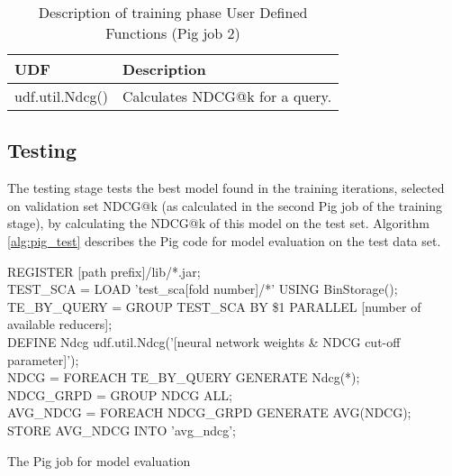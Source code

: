 \begin{table}
\centering
\begin{tabular}{p{6cm}p{7cm}}\toprule
UDF & Description \\
\midrule
udf.util.Ndcg() & Calculates \ac{NDCG}@k for a query.\\
\bottomrule
\end{tabular}
\caption{Description of training phase User Defined Functions (Pig job 2)}
\label{tbl:training_udfs_2}
\end{table}

\subsection{Testing}
The testing stage tests the best model found in the training iterations, selected on validation set \ac{NDCG}@k (as calculated in the second Pig job of the training stage), by calculating the \ac{NDCG}@k of this model on the test set. Algorithm \ref{alg:pig_test} describes the Pig code for model evaluation on the test data set.\\

\begin{algorithm}
REGISTER [path prefix]/lib/*.jar;\\
TEST\_SCA = LOAD 'test\_sca[fold number]/*' USING BinStorage();\\
TE\_BY\_QUERY = GROUP TEST\_SCA BY \$1 PARALLEL [number of available reducers];\\
DEFINE Ndcg udf.util.Ndcg('[neural network weights \& NDCG cut-off parameter]');\\
NDCG = FOREACH TE\_BY\_QUERY GENERATE Ndcg(*);\\
NDCG\_GRPD = GROUP NDCG ALL;\\
AVG\_NDCG = FOREACH NDCG\_GRPD GENERATE AVG(NDCG);\\
STORE AVG\_NDCG INTO 'avg\_ndcg';
\caption{The Pig job for model evaluation}
\label{alg:pig_test}
\end{algorithm}